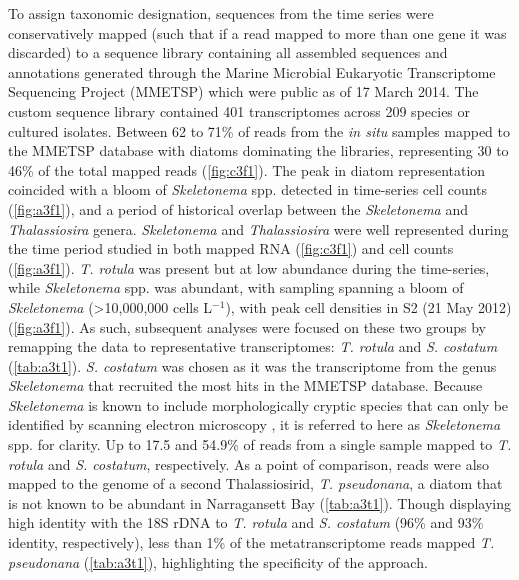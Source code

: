 To assign taxonomic designation, sequences from the time series were conservatively mapped (such that if a read mapped to more than one gene it was discarded) to a sequence library containing all assembled sequences and annotations generated through the Marine Microbial Eukaryotic Transcriptome Sequencing Project (MMETSP) \citep{Keeling2014} which were public as of 17 March 2014. The custom sequence library contained 401 transcriptomes across 209 species or cultured isolates. Between 62 to 71\% of reads from the \textit{in situ} samples mapped to the MMETSP database with diatoms dominating the libraries, representing 30 to 46\% of the total mapped reads (\cref{fig:c3f1}). The peak in diatom representation coincided with a bloom of \textit{Skeletonema} spp. detected in time-series cell counts (\cref{fig:a3f1}), and a period of historical overlap between the \textit{Skeletonema} and \textit{Thalassiosira} genera. \textit{Skeletonema} and \textit{Thalassiosira} were well represented during the time period studied in both mapped RNA (\cref{fig:c3f1}) and cell counts (\cref{fig:a3f1}). \textit{T. rotula} was present but at low abundance during the time-series, while \textit{Skeletonema} spp. was abundant, with sampling spanning a bloom of \textit{Skeletonema} (>10,000,000 cells L$^{-1}$), with peak cell densities in S2 (21 May 2012) (\cref{fig:a3f1}). As such, subsequent analyses were focused on these two groups by remapping the data to representative transcriptomes: \textit{T. rotula} and \textit{S. costatum} (\cref{tab:a3t1}). \textit{S. costatum} was chosen as it was the transcriptome from the genus \textit{Skeletonema} that recruited the most hits in the MMETSP database. Because \textit{Skeletonema} is known to include morphologically cryptic species that can only be identified by scanning electron microscopy \citep{Sarno2005, Zingone2005, Smayda2011}, it is referred to here as \textit{Skeletonema} spp. for clarity. Up to 17.5 and 54.9\% of reads from a single sample mapped to \textit{T. rotula} and \textit{S. costatum}, respectively. As a point of comparison, reads were also mapped to the genome of a second Thalassiosirid, \textit{T. pseudonana}, a diatom that is not known to be abundant in Narragansett Bay (\cref{tab:a3t1}). Though displaying high identity with the 18S rDNA to \textit{T. rotula} and \textit{S. costatum} (96\% and 93\% identity, respectively), less than 1\% of the metatranscriptome reads mapped \textit{T. pseudonana} (\cref{tab:a3t1}), highlighting the specificity of the approach. 

